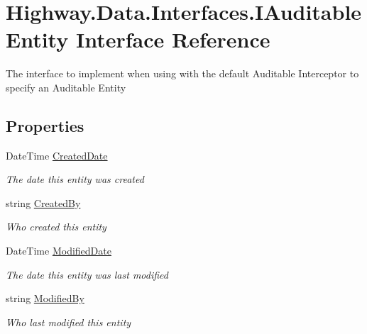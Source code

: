 \hypertarget{interface_highway_1_1_data_1_1_interfaces_1_1_i_auditable_entity}{\section{Highway.\-Data.\-Interfaces.\-I\-Auditable\-Entity Interface Reference}
\label{interface_highway_1_1_data_1_1_interfaces_1_1_i_auditable_entity}
}


The interface to implement when using with the default Auditable Interceptor to specify an Auditable Entity  


\subsection*{Properties}
\begin{DoxyCompactItemize}
\item 
Date\-Time \hyperlink{interface_highway_1_1_data_1_1_interfaces_1_1_i_auditable_entity_a24e61a7fc1bd175a00cb7dd54e44d193}{Created\-Date}
\begin{DoxyCompactList}\small\item\em The date this entity was created \end{DoxyCompactList}\item 
string \hyperlink{interface_highway_1_1_data_1_1_interfaces_1_1_i_auditable_entity_a0d61b38cdb0d857f95a648d74d47dc4e}{Created\-By}
\begin{DoxyCompactList}\small\item\em Who created this entity \end{DoxyCompactList}\item 
Date\-Time \hyperlink{interface_highway_1_1_data_1_1_interfaces_1_1_i_auditable_entity_a031bc6b61314bcd2c7f08aee90b461ff}{Modified\-Date}
\begin{DoxyCompactList}\small\item\em The date this entity was last modified \end{DoxyCompactList}\item 
string \hyperlink{interface_highway_1_1_data_1_1_interfaces_1_1_i_auditable_entity_afaaaaf4ceb8c53fbc36fb4193dbc1132}{Modified\-By}
\begin{DoxyCompactList}\small\item\em Who last modified this entity \end{DoxyCompactList}\end{DoxyCompactItemize}


